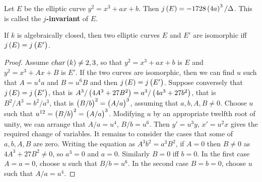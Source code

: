 
\begin{definition}
Let $ E $ be the elliptic curve $ y^2 = x^3 + ax + b $. Then $ j\br{E} = -1728\br{4a}^3 / \Delta $. This is called the \textbf{$ j $-invariant} of $ E $.
\end{definition}

\begin{proposition}
If $ k $ is algebraically closed, then two elliptic curves $ E $ and $ E' $ are isomorphic iff $ j\br{E} = j\br{E'} $.
\end{proposition}

\begin{proof}
Assume $ char\br{k} \ne 2, 3 $, so that $ y^2 = x^3 + ax + b $ is $ E $ and $ y^2 = x^3 + Ax + B $ is $ E' $. If the two curves are isomorphic, then we can find $ u $ such that $ A = u^4a $ and $ B = u^6B $ and then $ j\br{E} = j\br{E'} $. Suppose conversely that $ j\br{E} = j\br{E'} $, that is $ A^3 / \br{4A^3 + 27B^2} = a^3 / \br{4a^3 + 27b^2} $, that is $ B^2 / A^3 = b^2 / a^3 $, that is $ \br{B / b}^2 = \br{A / a}^3 $, assuming that $ a, b, A, B \ne 0 $. Choose $ u $ such that $ u^{12} = \br{B / b}^2 = \br{A / a}^3 $. Modifying $ u $ by an appropriate twelfth root of unity, we can arrange that $ A / a = u^4 $, $ B / b = u^6 $. Then $ y' = u^3y $, $ x' = u^2x $ gives the required change of variables. It remains to consider the cases that some of $ a, b, A, B $ are zero. Writing the equation as $ A^3b^2 = a^3B^2 $, if $ A = 0 $ then $ B \ne 0 $ as $ 4A^3 + 27B^2 \ne 0 $, so $ a^3 = 0 $ and $ a = 0 $. Similarly $ B = 0 $ iff $ b = 0 $. In the first case $ A = a = 0 $, choose $ u $ such that $ B / b = u^6 $. In the second case $ B = b = 0 $, choose $ u $ such that $ A / a = u^4 $.
\end{proof}

